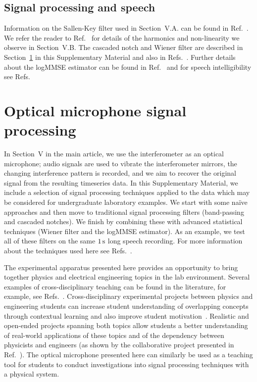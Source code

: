 \documentclass[aps,pra,superscriptaddress,reprint]{revtex4-2}
\begin{document}
\subsection{Signal processing and speech}
Information on the Sallen-Key filter used in Section~V.A. can be found in Ref.~\cite{sallen_key_filter}. 
We refer the reader to Ref.~\cite{feynman} for details of the harmonics and non-linearity we observe in Section~V.B. 
The cascaded notch and Wiener filter are described in Section~\ref{sec:opmic} in this Supplementary Material and also in  Refs.~\cite{10.5555/541204,10.5555/151045}.
Further details about the logMMSE estimator can be found in Ref.~\cite{Ephraim1984SpeechEU_logMMSE} and for speech intelligibility see Refs.~\cite{speech_intelligibility,SubjectiveComparison}



\section{Optical microphone signal processing}
\label{sec:opmic}

In Section~V in the main article, we use the interferometer as an optical microphone; audio signals are used to vibrate the interferometer mirrors, the changing interference pattern is recorded, and we aim to recover the original signal from the resulting timeseries data.
In this Supplementary Material, we include a selection of signal processing techniques applied to the data which may be considered for undergraduate laboratory examples. 
We start with some na{\"i}ve approaches and then move to traditional signal processing filters (band-passing and cascaded notches). 
We finish by combining these with advanced statistical techniques (Wiener filter and the logMMSE estimator). 
As an example, we test all of these filters on the same $1\,{\rm s}$ long speech recording.
For more information about the techniques used here see Refs.~\cite{Mitra:2011, Lyons:2011, Stein:2000, OpenheimSchaferBuck:1999, PrakisManolakis:1996,10.5555/151045, DigitalProcingOfSpeechSignals:1978}.

The experimental apparatus presented here provides an opportunity to bring together physics and electrical engineering topics in the lab environment. 
Several examples of cross-disciplinary teaching can be found in the literature, for example, see Refs.~\cite{OConnerSibrayForinash:2001, PiersonGurlandCrawford:2002, CafarelliEtAl:2012, MakanKopaszGingl:2014}. 
Cross-disciplinary experimental projects between physics and engineering students can increase student understanding of overlapping concepts through contextual learning and also improve student motivation~\cite{PiersonGurlandCrawford:2002}. 
Realistic and open-ended projects spanning both topics allow students a better understanding of real-world applications of these topics and of the dependency between physicists and engineers (as shown by the collaborative project presented in Ref.~\cite{OConnerSibrayForinash:2001}).
The optical microphone presented here can similarly be used as a teaching tool for students to conduct investigations into signal processing techniques with a physical system. 
\end{document}
